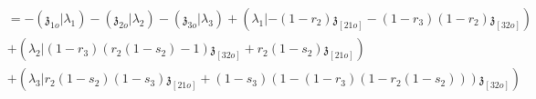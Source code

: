 \documentclass[11pt]{amsart}
\newcommand{\agraphW}{
  \mathbf{W}_{\tikz[baseline=-0.5ex]{
      \coordinate (A) at (0,0);
      \coordinate (B) at (4mm,0);
      \coordinate (C) at (2mm,2mm);
      \coordinate (D) at (2mm,-2mm);

      \fill (A) circle (0.5mm);
      \fill (B) circle (0.5mm);
      \fill (C) circle (0.5mm);
      \fill (D) circle (0.5mm);

      \draw (A) -- (C);
      \draw (A) -- (D);
      \draw (C) -- (D);
      \draw (B) -- (C);
      \draw (B) -- (D);
  }}
}
\newcommand{\triangleW}{
  \mathbf{W}_{\tikz[baseline=-0.5ex]{\node[regular polygon, regular polygon sides=3, inner sep=0pt, draw, minimum size=4mm] (triangle) {};
      \fill (triangle.corner 1) circle (0.5mm);
      \fill (triangle.corner 2) circle (0.5mm);
      \fill (triangle.corner 3) circle (0.5mm);}}
}
\theoremstyle{definition}
\theoremstyle{remark}
\numberwithin{equation}{section}
\begin{document}
\begin{align*}
&=-(\mathfrak{z}_{1o}|\lambda_1)-(\mathfrak{z}_{2o}|\lambda_2)-\left(\mathfrak{z}_{3o}|\lambda_{3}\right)+\left(\lambda_1|-(1-r_{2})\mathfrak{z}_{[2 1o]}-(1-r_3)(1-r_2)\mathfrak{z}_{[32o]}\right)\\
&+\left(\lambda_2|(1-r_{3})(r_2(1-s_2)-1)\mathfrak{z}_{[3 2o]}+r_2(1-s_2)\mathfrak{z}_{[2 1o]}\right)\\
&+\left(\lambda_3|r_2(1-s_2)(1-s_3)\mathfrak{z}_{[21o]}+(1-s_3)(1-(1-r_3)(1-r_2(1-s_2)))\mathfrak{z}_{[32o]}\right)\\
\end{align*}
\fi
\iffalse
  Let
  $$
t_1=r_2(1-s_2),t_3=(1-r_3)(1-t_1),\tilde{s}_1=\frac{(1-r_2)}{1-r_2(1-s_2)}=\frac{1-r_2}{1-t_1},\tilde{s}_3=1-s_3.
$$
$$
r_2=1-\tilde{s}_1(1-t_1),1-s_2=\frac{t_1}{1-\tilde{s}_1(1-t_1)}, 1-r_3=\frac{t_3}{1-t_1}.
$$
Then
\begin{align*}
      \agraphW &=-(\mathfrak{z}_{1o}|\lambda_1)-(\mathfrak{z}_{2o}|\lambda_2)-\left(\mathfrak{z}_{3o}|\lambda_{3}\right)+\left(\lambda_1|-\tilde{s}_1(1-t_1)\mathfrak{z}_{[2 1o]}+\tilde{s}_1t_3\mathfrak{z}_{[23o]}\right)\\
&+\left(\lambda_2|t_3\mathfrak{z}_{[23o]}+t_1\mathfrak{z}_{[2 1o]}\right)+\left(\lambda_3|t_1\tilde{s}_3\mathfrak{z}_{[21o]}-\tilde{s}_3(1-t_3)\mathfrak{z}_{[32o]}\right)\\
\end{align*}
\begin{align*}
  &( \partial_{\mathfrak{z}_{2o}}\triangleW)\wedge\lambda_3  \cdot r_2r_3dr_2ds_2dr_3ds_3\\
  &=\left((\tilde{s}_1\lambda_1+\lambda_2)\wedge\lambda_3 \right)\cdot (1-t_1)(1-\tilde{s}_1(1-t_1))(1-\frac{t_3}{1-t_1})d(1-\tilde{s}_1(1-t_1))d(\frac{t_1}{1-\tilde{s}_1(1-t_1)})d(\frac{t_3}{1-t_1})ds_3\\
   & =\left((\tilde{s}_1\lambda_1+\lambda_2)\wedge\lambda_3 \right)\cdot (1-t_1)(1-\frac{t_3}{1-t_1})d(1-\tilde{s}_1(1-t_1))dt_1d(\frac{t_3}{1-t_1})ds_3\\
   &=\left((\tilde{s}_1\lambda_1+\lambda_2)\wedge\lambda_3 \right)\cdot(1-t_1-t_3)d\tilde{s}_1dt_1dt_3ds_3.
\end{align*}
Finally
\begin{align*}
&\int_{\Delta_2\times\Delta_1\times\Delta_1}(1-t_3-t_1)\cdot(\lambda_3\wedge(s_1\lambda_1+\lambda_2))\cdot (\lambda_1\wedge(s_3\lambda_3+\lambda_2)) \cdot dt_1dt_3ds_1ds_3\\
&=\frac{1}{6}(\lambda_3\wedge(\frac{1}{2}\lambda_1+\lambda_2))\cdot (\lambda_1\wedge(\frac{1}{2}\lambda_3+\lambda_2))\\
&=\frac{1}{24}(\lambda_3\wedge(\lambda_1+2\lambda_2))\cdot (\lambda_1\wedge(\lambda_3+2\lambda_2)).
      \end{align*}
      \fi
\end{document}
